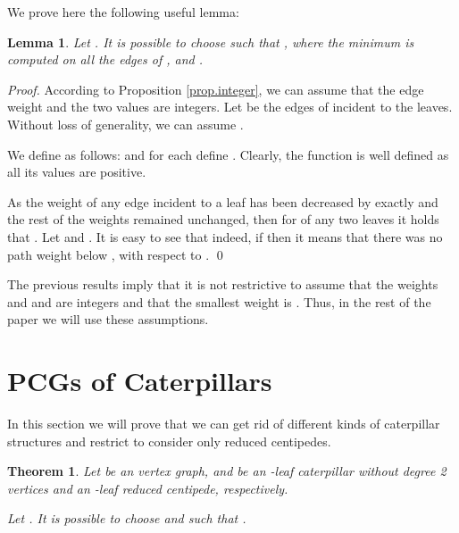 \documentclass[review]{elsarticle}
\newtheorem{theorem}{Theorem}
\newtheorem{lemma}{Lemma}
\begin{document}
We prove here the following useful lemma:
\begin{lemma}
\label{lemma.1}
Let . It is possible to choose  such that , where the minimum is computed on all the edges of , and  .
\end{lemma}

\begin{proof}
According to Proposition \ref{prop.integer}, we can assume that the edge weight  and the two values  are integers.
Let  be the edges of  incident to the leaves.
Without loss of generality, we can assume .

We define  as follows:
 and for each  define .
Clearly, the function  is well defined as all its values are positive.

As the weight of any edge incident to a leaf has been decreased by exactly  and the rest of the weights remained unchanged, then for of any two leaves  it holds that  . 
Let  and . 
It is easy to see that  indeed, if  then it means that there was no path weight below , with respect to . \qed
\end{proof}

The previous results imply that it is not restrictive to assume that the weights and  and  are integers and that the smallest weight is .  Thus, in the rest of the paper we  will use these assumptions.

\section{PCGs of Caterpillars}


In this section we will prove that we can get rid of different kinds of caterpillar structures and restrict to consider only reduced centipedes. 

\begin{theorem}
\label{th.caterpillar}
Let  be an  vertex graph,  and  be an -leaf caterpillar without degree 2 vertices and an -leaf reduced centipede, respectively.

Let .
It is possible to choose  and   such that . 
\end{theorem}
\end{document}
